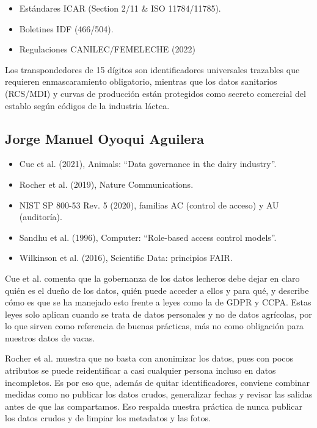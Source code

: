 \begin{itemize}
  \item Estándares ICAR (Section 2/11 \& ISO 11784/11785).
  \item Boletines IDF (466/504).
  \item Regulaciones CANILEC/FEMELECHE (2022)
\end{itemize}

Los transpondedores de 15 dígitos son identificadores universales trazables que requieren enmascaramiento obligatorio, mientras que los datos sanitarios (RCS/MDI) y curvas de producción están protegidos como secreto comercial del establo según códigos de la industria láctea.

\subsection{Jorge Manuel Oyoqui Aguilera}

\begin{itemize}
  \item Cue et al. (2021), Animals: “Data governance in the dairy industry”.
  \item Rocher et al. (2019), Nature Communications.
  \item NIST SP 800-53 Rev. 5 (2020), familias AC (control de acceso) y AU (auditoría).
  \item Sandhu et al. (1996), Computer: “Role-based access control models”.
  \item Wilkinson et al. (2016), Scientific Data: principios FAIR.
\end{itemize}

Cue et al. comenta que la gobernanza de los datos lecheros debe dejar en claro quién es el dueño de los datos, quién puede acceder a ellos y para qué, y describe cómo es que se ha manejado esto frente a leyes como la de GDPR y CCPA. Estas leyes solo aplican cuando se trata de datos personales y no de datos agrícolas, por lo que sirven como referencia de buenas prácticas, más no como obligación para nuestros datos de vacas.

Rocher et al. muestra que no basta con anonimizar los datos, pues con pocos atributos se puede reidentificar a casi cualquier persona incluso en datos incompletos. Es por eso que, además de quitar identificadores, conviene combinar medidas como no publicar los datos crudos, generalizar fechas y revisar las salidas antes de que las compartamos. Eso respalda nuestra práctica de nunca publicar los datos crudos y de limpiar los metadatos y las fotos.

